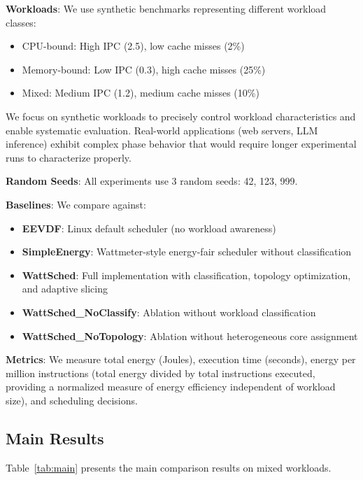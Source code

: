 \documentclass{article}
\begin{document}
\textbf{Workloads}: We use synthetic benchmarks representing different workload classes:
\begin{itemize}
    \item CPU-bound: High IPC (2.5), low cache misses (2\%)
    \item Memory-bound: Low IPC (0.3), high cache misses (25\%)
    \item Mixed: Medium IPC (1.2), medium cache misses (10\%)
\end{itemize}

We focus on synthetic workloads to precisely control workload characteristics and enable systematic evaluation. Real-world applications (web servers, LLM inference) exhibit complex phase behavior that would require longer experimental runs to characterize properly.

\textbf{Random Seeds}: All experiments use 3 random seeds: 42, 123, 999.

\textbf{Baselines}: We compare against:
\begin{itemize}
    \item \textbf{EEVDF}: Linux default scheduler (no workload awareness)
    \item \textbf{SimpleEnergy}: Wattmeter-style energy-fair scheduler without classification
    \item \textbf{WattSched}: Full implementation with classification, topology optimization, and adaptive slicing
    \item \textbf{WattSched\_NoClassify}: Ablation without workload classification
    \item \textbf{WattSched\_NoTopology}: Ablation without heterogeneous core assignment
\end{itemize}

\textbf{Metrics}: We measure total energy (Joules), execution time (seconds), energy per million instructions (total energy divided by total instructions executed, providing a normalized measure of energy efficiency independent of workload size), and scheduling decisions.

\subsection{Main Results}

Table~\ref{tab:main} presents the main comparison results on mixed workloads.
\end{document}

